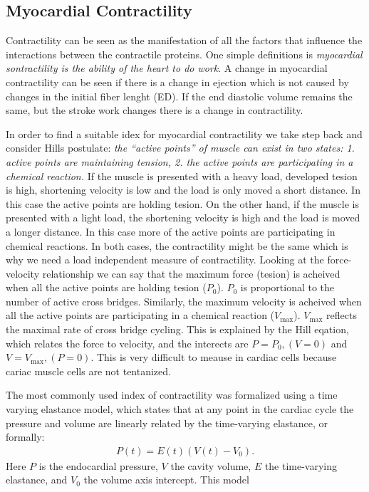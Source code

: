 \subsection{Myocardial Contractility}

Contractility can be seen as the manifestation of all the factors that
influence the interactions between the contractile proteins.
One simple definitions is \emph{myocardial sontractility is the
  ability of the heart to do work}. A change in myocardial
contractility can be seen if there is a change in ejection which is
not caused by changes in the initial fiber lenght (ED). If the end
diastolic volume remains the same, but the stroke work changes there
is a change in contractility.



In order to find a suitable idex for myocardial contractility we take
step back and consider Hills postulate: \emph{the ``active points'' of
  muscle can exist in two states: 1. active points are maintaining
  tension, 2. the active points are participating in a chemical
  reaction.} 
If the muscle is presented with a heavy load, developed tesion is
high, shortening velocity is low and the load is only moved a short
distance. In this case the active points are holding tesion.
On the other hand, if the muscle is presented with a light load, the
shortening velocity is high and the load is moved a longer
distance. In this case more of the active points are participating in
chemical reactions. 
In both cases, the contractility might be the same which is why we
need a load independent measure of contractility.
Looking at the force-velocity relationship we can say that the maximum
force (tesion) is acheived when all the active points are holding
tesion ($P_0$). $P_0$ is proportional to the number of active
cross bridges.
Similarly, the maximum velocity is acheived when all
the active points are participating in a chemical reaction
($V_{\text{max}}$). $V_{\text{max}}$ reflects the maximal rate of
cross bridge cycling. 
This is explained by the Hill eqation, which
relates the force to velocity, and the interects are $P = P_0, (V = 0)$
and $V = V_{\text{max}}, (P = 0)$. This is very difficult to meause in
cardiac cells because cariac muscle cells are not tentanized.

The most commonly used index of contractility was formalized
\cite{sagawa1977end} using a time varying elastance model, which
states that at any point in the cardiac cycle the pressure and volume
are linearly related by the time-varying elastance, or formally:
\begin{align}
  P(t) = E(t)( V(t) - V_0 ).
  \label{eq:time_varying_elastance}
\end{align}
Here $P$ is the endocardial pressure, $V$ the cavity volume, $E$ the
time-varying elastance, and $V_0$ the volume axis intercept. This
model  


